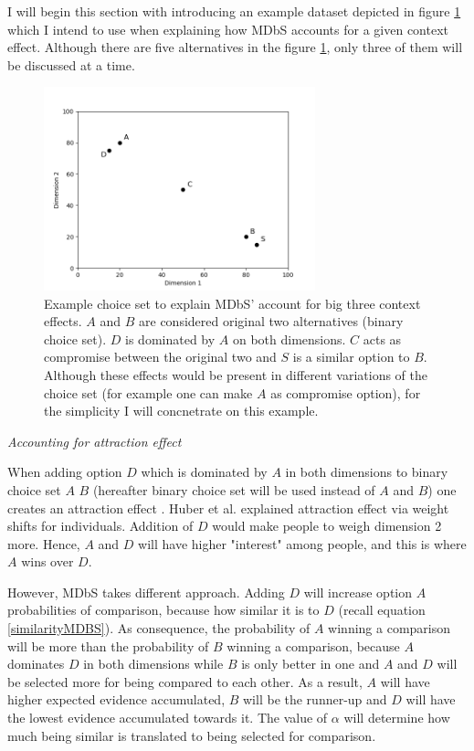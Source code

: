 \documentclass[a4paper,12pt]{article}
\newcommand{\citeyearonly}[1]{\citeyearpar{#1}}
\begin{document}
I will begin this section with introducing an example dataset depicted in figure \ref{fig:MDBsContextExample} which I intend to use when explaining how MDbS accounts for a given context effect. Although there are five alternatives in the figure \ref{fig:MDBsContextExample}, only three of them will be discussed at a time. 

\begin{figure}[h]
    \centering
    \includegraphics[width=0.7\textwidth]{staticFiles/contextEffectExampleScatterplot.png}
    \caption{Example choice set to explain MDbS' account for big three context effects. $A$ and $B$ are considered original two alternatives (binary choice set). $D$ is dominated by $A$ on both dimensions. $C$ acts as compromise between the original two and $S$ is a similar option to $B$. Although these effects would be present in different variations of the choice set (for example one can make $A$ as compromise option), for the simplicity I will concnetrate on this example.} %
    \label{fig:MDBsContextExample} %

\end{figure}

\textit{Accounting for attraction effect}

When adding option $D$ which is dominated by $A$ in both dimensions to binary choice set $A$ $B$ (hereafter binary choice set will be used instead of $A$ and $B$) one creates an attraction effect \citep{huberEtAl82, huberPuto83}. Huber et al. \citeyearonly{huberEtAl82} explained attraction effect via weight shifts for individuals. Addition of $D$ would make people to weigh dimension 2 more. Hence, $A$ and $D$ will have higher "interest" among people, and this is where $A$ wins over $D$.

However, MDbS takes different approach. Adding $D$ will increase option $A$ probabilities of comparison, because how similar it is to $D$ (recall equation \ref{similarityMDBS}). As consequence, the probability of $A$ winning a comparison will be more than the probability of $B$ winning a comparison, because $A$ dominates $D$ in both dimensions while $B$ is only better in one and $A$ and $D$ will be selected more for being  compared to each other. As a result, $A$ will have higher expected evidence accumulated, $B$ will be the runner-up and $D$ will have the lowest evidence accumulated towards it. The value of $\alpha$ will determine how much being similar is translated to being selected for comparison.
\end{document}
